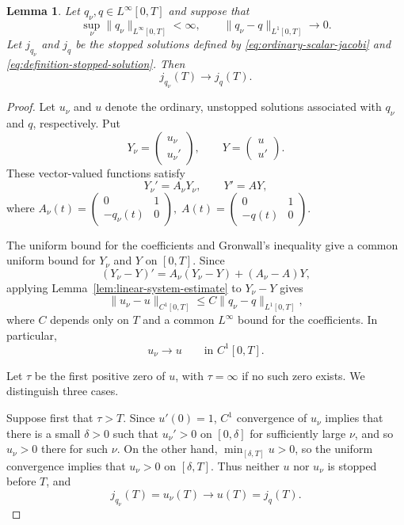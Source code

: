 \documentclass[11pt, reqno]{amsart}
\newtheorem{lemma}{Lemma}
\begin{document}
\begin{lemma}
\label{lem:stopped-continuity}
Let $q_\nu, q\in L^\infty[0, T]$ and suppose that
$$
\sup_\nu\lVert q_\nu\rVert_{L^\infty[0, T]}<\infty, \qquad \lVert q_\nu-q\rVert_{L^1[0, T]}\longrightarrow0.
$$
Let $j_{q_\nu}$ and $j_q$ be the stopped solutions defined by \eqref{eq:ordinary-scalar-jacobi} and \eqref{eq:definition-stopped-solution}. Then
\begin{equation*}\label{eq:stopped-continuity}
j_{q_\nu}(T)\longrightarrow j_q(T).
\end{equation*}
\end{lemma}

\begin{proof}
Let $u_\nu$ and $u$ denote the ordinary, unstopped solutions associated with $q_\nu$ and $q$, respectively. Put
$$
Y_\nu=
\begin{pmatrix}
u_\nu\\
u_\nu'
\end{pmatrix},
\qquad
Y=
\begin{pmatrix}
u\\
u'
\end{pmatrix}.
$$
These vector-valued functions satisfy
$$
Y_\nu'=A_\nu Y_\nu,
\qquad
Y'=AY,
$$
where $
A_\nu(t)=
\begin{pmatrix}
0& 1\\
-q_\nu(t)& 0
\end{pmatrix}, \;
A(t)=
\begin{pmatrix}
0& 1\\
-q(t)& 0
\end{pmatrix}
$.

The uniform bound for the coefficients and Gronwall's inequality give a common uniform bound for $Y_\nu$ and $Y$ on $[0, T]$. Since
$$
(Y_\nu-Y)' = A_\nu(Y_\nu-Y)+(A_\nu-A)Y,
$$
applying Lemma~\ref{lem:linear-system-estimate} to $Y_\nu-Y$ gives
\begin{equation*}\label{eq:ordinary-C1-convergence}
\lVert u_\nu-u\rVert_{C^1[0, T]}
\le C\lVert q_\nu-q\rVert_{L^1[0, T]},
\end{equation*}
where $C$ depends only on $T$ and a common $L^\infty$ bound for the coefficients. In particular,
$$ u_\nu\longrightarrow u \qquad\text{in }C^1[0, T]. $$

Let $\tau$ be the first positive zero of $u$, with $\tau=\infty$ if no such zero exists. We distinguish three cases.

Suppose first that $\tau>T$. Since $u'(0)=1$, $C^1$ convergence of $u_\nu$ implies that there is a small $\delta>0$ such that $u_\nu'>0$ on $[0, \delta]$ for sufficiently large $\nu$, and so $u_\nu>0$ there for such $\nu$. On the other hand, $\min_{[\delta, T]}u>0$, so the uniform convergence implies that $u_\nu>0$ on $[\delta, T]$. Thus neither $u$ nor $u_\nu$ is stopped before $T$, and
$$j_{q_\nu}(T)=u_\nu(T)\longrightarrow u(T)=j_q(T). $$


\end{proof}
\end{document}
